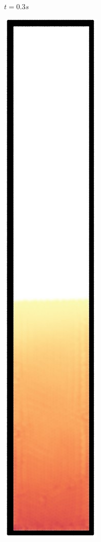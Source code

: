 \begin{figure}[h]
\begin{subfigure}[t]{0.09\textwidth}
    \caption{\small{$t=0.3s$}}
  \end{subfigure}%
  \begin{subfigure}[t]{0.09\textwidth}
    \includegraphics[width=\textwidth]{images/oscillate/040.jpg}

\end{subfigure}
\end{figure}
